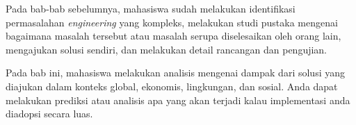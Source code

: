 Pada bab-bab sebelumnya, mahasiswa sudah melakukan identifikasi permasalahan \textit{engineering} yang kompleks, melakukan studi pustaka mengenai bagaimana masalah tersebut atau masalah serupa diselesaikan oleh orang lain, mengajukan solusi sendiri, dan melakukan detail rancangan dan pengujian.

Pada bab ini, mahasiswa melakukan analisis mengenai dampak dari solusi yang diajukan dalam konteks global, ekonomis, lingkungan, dan sosial. Anda dapat melakukan prediksi atau analisis apa yang akan terjadi kalau implementasi anda diadopsi secara luas.